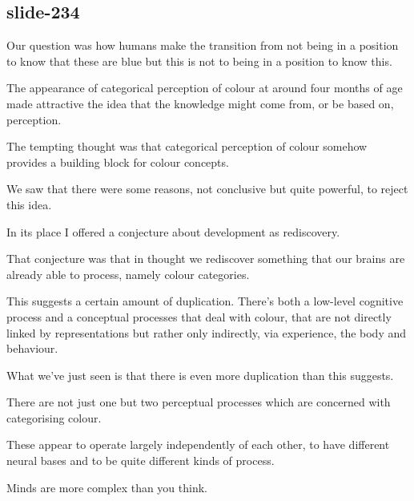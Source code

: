 \documentclass[12pt,\papersize]{extarticle}
\begin{document}
\subsection{slide-234}
Our question was how humans make the transition from not being in a position to know that these are blue but this is not to being in a position to know this.
 
The appearance of categorical perception of colour at around four months of age made attractive the idea that the knowledge might come from, or be based on, perception.
 
The tempting thought was that categorical perception of colour somehow provides a building block for colour concepts.
 
We saw that there were some reasons, not conclusive but quite powerful, to reject this idea.
 
In its place I offered a conjecture about development as rediscovery.
 
That conjecture was that in thought we rediscover something that our brains are already able to process, namely colour categories.
 
This suggests a certain amount of duplication.  There's both a low-level cognitive process and a conceptual processes that deal with colour, that are not directly linked by representations but rather only indirectly, via experience, the body and behaviour.
 
What we've just seen is that there is even more duplication than this suggests.
 
There are not just one but two perceptual processes which are concerned with categorising colour.
 
These appear to operate largely independently of each other, to have different neural bases and to be quite different kinds of process.
 
Minds are more complex than you think.
 
 






\end{document}

